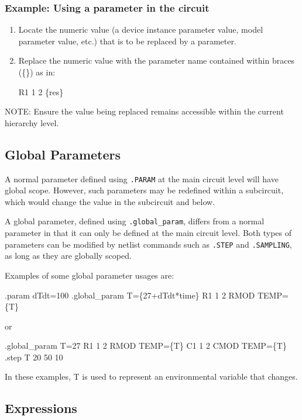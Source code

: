 \subsubsection{Example:  Using a parameter in the circuit}
\begin{enumerate}
\item Locate the numeric value (a device instance parameter value, model parameter value, etc.) that is to be replaced by a parameter.  
\item Replace the numeric value with the parameter name contained within braces
  (\{\}) as in:
\begin{vquote}
R1 1 2 \{res\}
\end{vquote}
\end{enumerate}

NOTE:	Ensure the value being replaced remains accessible within the current hierarchy level.

\subsection{Global Parameters}
 
A normal parameter defined using \texttt{.PARAM} at the main circuit level will have global scope.
However, such parameters may be redefined within a subcircuit, which would change the value
in the subcircuit and below.  

A global parameter, defined using \texttt{.global\_param}, differs from a normal parameter 
in that it can only be defined at the main circuit level.   
Both types of parameters can be modified by netlist commands 
such as \texttt{.STEP} and \texttt{.SAMPLING}, as long as they are globally scoped.  

Examples of some global parameter usages are:
\begin{vquote}
.param dTdt=100
.global_param T=\{27+dTdt*time\}
R1  1  2  RMOD TEMP=\{T\}

or

.global_param T=27
R1  1  2  RMOD TEMP=\{T\}
C1  1  2  CMOD TEMP=\{T\}
.step T 20 50 10
\end{vquote}
In these examples, T is used to represent an environmental variable that changes.

\subsection{Expressions}

